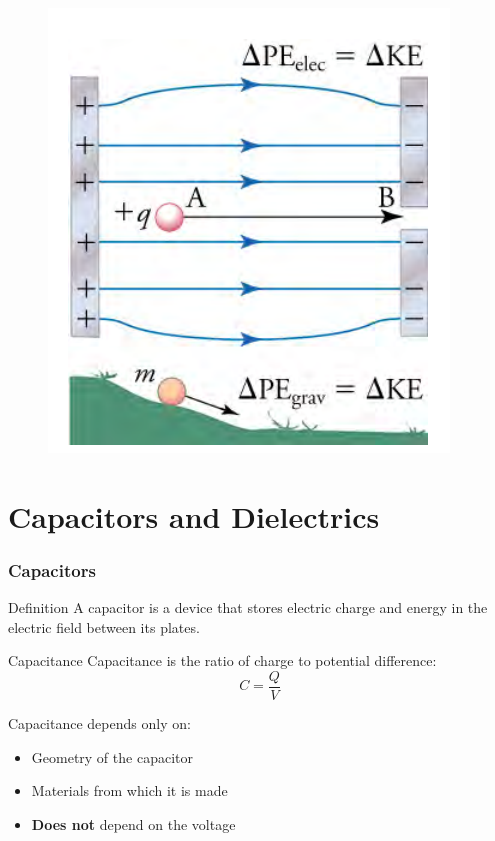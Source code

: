 \documentclass{beamer}
\begin{document}
\begin{frame}
    
       \begin{figure}
           \centering
           \includegraphics[width=0.6\linewidth]{phys11-electrostatics-charge-movement-in-potential.png}
       \end{figure}
    
\end{frame}

\section{Capacitors and Dielectrics}

\begin{frame}
    \frametitle{Capacitors}
    \begin{block}{Definition}
        A capacitor is a device that stores electric charge and energy in the electric field between its plates.
    \end{block}
    
    \begin{block}{Capacitance}
        Capacitance is the ratio of charge to potential difference:
        \begin{equation}
            C = \frac{Q}{V}
        \end{equation}
        
        Capacitance depends only on:
        \begin{itemize}
            \item Geometry of the capacitor
            \item Materials from which it is made
            \item \textbf{Does not} depend on the voltage
        \end{itemize}
    \end{block}
    \end{frame}
\end{document}
